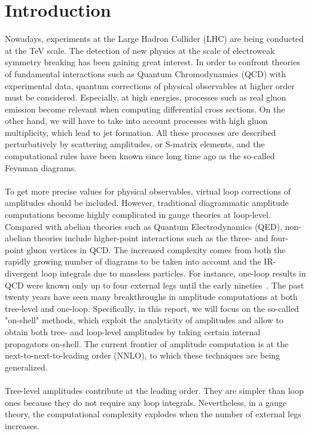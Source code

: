 \section{Introduction}
Nowadays, experiments at the Large Hadron Collider (LHC) are being conducted at the TeV scale.
The detection of new physics at the scale of electroweak symmetry breaking has been gaining great interest. 
In order to confront theories of fundamental interactions such as Quantum Chromodynamics (QCD) with experimental data,
quantum corrections of physical observables at higher order must be considered. 
Especially, at high energies, processes such as real gluon emission become relevant when computing differential cross sections. 
On the other hand, we will have to take into account processes with high gluon multiplicity, which lead to jet formation.
All these processes are described perturbatively by scattering amplitudes, or S-matrix elements, and the computational rules have been known since long time ago as the so-called Feynman diagrams. 
\\\\
To get more precise values for physical observables, virtual loop corrections of amplitudes should be included.
However, traditional diagrammatic amplitude computations become highly complicated in gauge theories at loop-level.
Compared with abelian theories such as Quantum Electrodynamics (QED), non-abelian theories include higher-point interactions such as the three- and four-point gluon vertices in QCD.
The increased complexity comes from both the rapidly growing number of diagrams to be taken into account and the IR-divergent loop integrals due to massless particles.  
For instance, one-loop results in QCD were known only up to four external legs until the early nineties~\cite{Bern:1994zx}. 
The past twenty years have seen many breakthroughs in amplitude computations at both tree-level and one-loop.
Specifically, in this report, we will focus on the so-called "on-shell" methods, which exploit the analyticity of amplitudes and allow to obtain both tree- and loop-level amplitudes by taking certain internal propagators on-shell.  
The current frontier of amplitude computation is at the next-to-next-to-leading order (NNLO), to which these techniques are being generalized.
\\\\
Tree-level amplitudes contribute at the leading order. 
They are simpler than loop ones because they do not require any loop integrals.
Nevertheless, in a gauge theory, the computational complexity explodes when the number of external legs increases.
